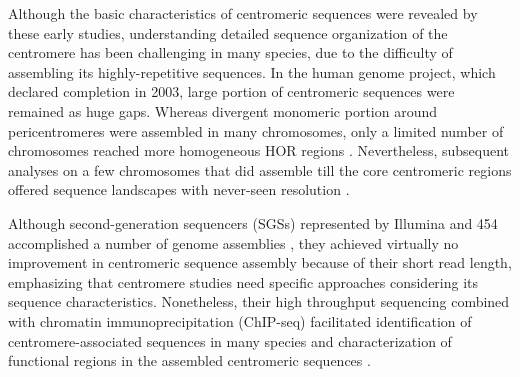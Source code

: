 Although the basic characteristics of centromeric sequences were revealed by these early studies, understanding detailed sequence organization of the centromere has been challenging in many species, due to the difficulty of assembling its highly-repetitive sequences. In the human genome project, which declared completion in 2003, large portion of centromeric sequences were remained as huge gaps. Whereas divergent monomeric portion around pericentromeres were assembled in many chromosomes, only a limited number of chromosomes reached more homogeneous HOR regions \cite{M.KatharineRuddand2004, She2004}. Nevertheless, subsequent analyses on a few chromosomes that did assemble till the core centromeric regions offered sequence landscapes with never-seen resolution \cite{Schueler2001, Ross2005, Nusbaum2006, Rudd2006}.

Although second-generation sequencers (SGSs) represented by Illumina and 454 accomplished a number of genome assemblies \cite{Schatz2010}, they achieved virtually no improvement in centromeric sequence assembly because of their short read length, emphasizing that centromere studies need specific approaches considering its sequence characteristics. Nonetheless, their high throughput sequencing combined with chromatin immunoprecipitation (ChIP-seq) facilitated identification of centromere-associated sequences in many species \cite{} and characterization of functional regions in the assembled centromeric sequences \cite{Hayden2013}.

